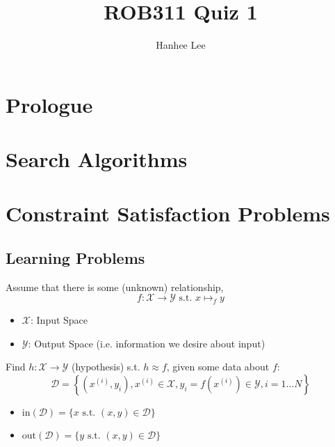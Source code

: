 \documentclass{article}
\title{ROB311 Quiz 1}
\author{Hanhee Lee}
\begin{document}
\maketitle

\tableofcontents
\newpage

\section{Prologue}

\newpage

\section{Search Algorithms}

\newpage

\section{Constraint Satisfaction Problems}

\newpage

\begin{center}
    \section*{Learning Problems}
\end{center}
\begin{definition}
    Assume that there is some (unknown) relationship, 
    \begin{equation*}
        f: \mathcal{X} \rightarrow \mathcal{Y} \text{ s.t. } x \mapsto_f y
    \end{equation*}
    \begin{itemize}
        \item $\mathcal{X}$: Input Space
        \item $\mathcal{Y}$: Output Space (i.e. information we desire about input)
    \end{itemize}
    \vspace{1em}

    Find $h: \mathcal{X} \rightarrow \mathcal{Y}$ (hypothesis) s.t. $h \approx f$, given some data about $f$: 
    \begin{equation*}
        \mathcal{D} = \left\{ \left(x^{(i)}, y_i\right), x^{(i)} \in \mathcal{X}, y_i = f\left(x^{(i)}\right) \in \mathcal{Y}, i = 1 \ldots N \right\}
    \end{equation*}

    \begin{itemize}
        \item $\text{in}(\mathcal{D}) = \{x \text{ s.t. } (x,y) \in \mathcal{D}\}$
        \item $\text{out}(\mathcal{D}) = \{y \text{ s.t. } (x,y) \in \mathcal{D}\}$
    \end{itemize}
\end{definition}
\end{document}
